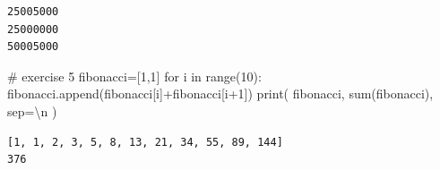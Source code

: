\documentclass[
  letterpaper,
  DIV=11,
  numbers=noendperiod]{scrreprt}
\newenvironment{Shaded}{\begin{snugshade}}{\end{snugshade}}
\newcommand{\BuiltInTok}[1]{\textcolor[rgb]{0.00,0.23,0.31}{#1}}
\newcommand{\CharTok}[1]{\textcolor[rgb]{0.13,0.47,0.30}{#1}}
\newcommand{\CommentTok}[1]{\textcolor[rgb]{0.37,0.37,0.37}{#1}}
\newcommand{\ControlFlowTok}[1]{\textcolor[rgb]{0.00,0.23,0.31}{#1}}
\newcommand{\DecValTok}[1]{\textcolor[rgb]{0.68,0.00,0.00}{#1}}
\newcommand{\KeywordTok}[1]{\textcolor[rgb]{0.00,0.23,0.31}{#1}}
\newcommand{\NormalTok}[1]{\textcolor[rgb]{0.00,0.23,0.31}{#1}}
\newcommand{\OperatorTok}[1]{\textcolor[rgb]{0.37,0.37,0.37}{#1}}
\newcommand{\StringTok}[1]{\textcolor[rgb]{0.13,0.47,0.30}{#1}}
\begin{document}
\begin{verbatim}
25005000
25000000
50005000
\end{verbatim}

\begin{Shaded}
\begin{Highlighting}[]
\CommentTok{\# exercise 5}
\NormalTok{fibonacci}\OperatorTok{=}\NormalTok{[}\DecValTok{1}\NormalTok{,}\DecValTok{1}\NormalTok{]}
\ControlFlowTok{for}\NormalTok{ i }\KeywordTok{in} \BuiltInTok{range}\NormalTok{(}\DecValTok{10}\NormalTok{):}
\NormalTok{    fibonacci.append(fibonacci[i]}\OperatorTok{+}\NormalTok{fibonacci[i}\OperatorTok{+}\DecValTok{1}\NormalTok{])}
\BuiltInTok{print}\NormalTok{(}
\NormalTok{    fibonacci,}
    \BuiltInTok{sum}\NormalTok{(fibonacci),}
\NormalTok{    sep}\OperatorTok{=}\StringTok{\textquotesingle{}}\CharTok{\textbackslash{}n}\StringTok{\textquotesingle{}}
\NormalTok{)}
\end{Highlighting}
\end{Shaded}

\begin{verbatim}
[1, 1, 2, 3, 5, 8, 13, 21, 34, 55, 89, 144]
376
\end{verbatim}
\end{document}
